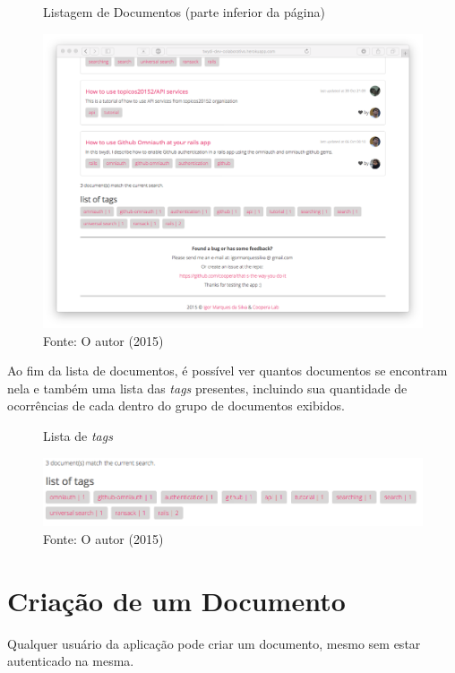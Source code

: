\begin{figure}[h]
	\centering
    \caption{Listagem de Documentos (parte inferior da página)}
    \includegraphics[width=15cm]{Imagens/print-lista-2.png}
	\caption*{Fonte: O autor (2015)}
\end{figure}

Ao fim da lista de documentos, é possível ver quantos documentos se encontram nela e também uma lista das \textit{tags} presentes, incluindo sua quantidade de ocorrências de cada dentro do grupo de documentos exibidos.

\begin{figure}[h]
	\centering
    \caption{Lista de \textit{tags}}
    \includegraphics[width=15cm]{Imagens/print-tags.png}
	\caption*{Fonte: O autor (2015)}
\end{figure}


\section{Criação de um Documento}

Qualquer usuário da aplicação pode criar um documento, mesmo sem estar autenticado na mesma.


